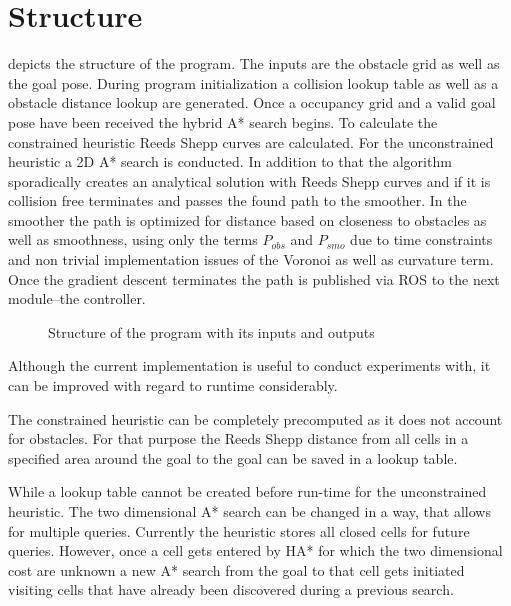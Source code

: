 \section{Structure}
 depicts the structure of the program. The inputs are the obstacle grid as well as the goal pose. During program initialization a collision lookup table as well as a obstacle distance lookup are generated. Once a occupancy grid and a valid goal pose have been received the hybrid A* search begins. To calculate the constrained heuristic Reeds Shepp curves are calculated. For the unconstrained heuristic a 2D A* search is conducted. In addition to that the algorithm sporadically creates an analytical solution with Reeds Shepp curves and if it is collision free terminates and passes the found path to the smoother. In the smoother the path is optimized for distance based on closeness to obstacles as well as smoothness, using only the terms $P_{obs}$ and $P_{smo}$ due to time constraints and non trivial implementation issues of the Voronoi as well as curvature term. Once the gradient descent terminates the path is published via ROS to the next module--the controller.

\begin{figure}[h]
    \caption{Structure of the program with its inputs and outputs}
    \label{fig:programStructure}
\end{figure}

Although the current implementation is useful to conduct experiments with, it can be improved with regard to runtime considerably.

The constrained heuristic can be completely precomputed as it does not account for obstacles. For that purpose the Reeds Shepp distance from all cells in a specified area around the goal to the goal can be saved in a lookup table.

While a lookup table cannot be created before run-time for the unconstrained heuristic. The two dimensional A* search can be changed in a way, that allows for multiple queries. Currently the heuristic stores all closed cells for future queries. However, once a cell gets entered by HA* for which the two dimensional cost are unknown a new A* search from the goal to that cell gets initiated visiting cells that have already been discovered during a previous search.


